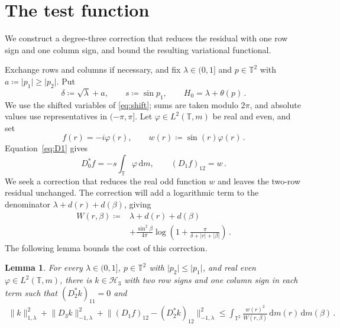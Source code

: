 \documentclass[11pt]{amsart}
\theoremstyle{plain}
\newtheorem{lemma}[theorem]{Lemma}
\theoremstyle{definition}
\newcommand{\T}{\mathbb T}
\newcommand{\1}{\mathbf 1}
\newcommand{\norm}[1]{\lVert #1\rVert}
\newcommand{\abs}[1]{\lvert #1\rvert}
\newcommand{\dd}{\,\mathrm d}
\newcommand{\Hs}{\mathcal H}
\newcommand{\Hminus}[1]{\norm{#1}_{-1,\lambda}}
\newcommand{\Hplus}[1]{\norm{#1}_{1,\lambda}}
\begin{document}
\section{The test function}\label{sec:evaluation}

We construct a degree-three correction that reduces the residual with
one row sign and one column sign, and bound the resulting variational
functional.

Exchange rows and columns if necessary, and fix
$\lambda\in(0,1]$ and $p\in\T^2$ with
$a\coloneqq\abs{p_1}\geq\abs{p_2}$.
Put
\begin{equation}\label{eq:degree-one-parameters}
  \delta\coloneqq\sqrt\lambda+a,\qquad
  s\coloneqq\sin p_1,\qquad H_0=\lambda+\theta(p)\, .
\end{equation}
We use the shifted variables of \eqref{eq:shift}; sums are taken modulo
$2\pi$, and absolute values use representatives in $(-\pi,\pi]$.
Let $\varphi\in L^2(\T,m)$ be real and even, and set
\begin{equation}\label{eq:f}
  f(r)=-i\varphi(r),\qquad w(r)\coloneqq\sin(r)\varphi(r)\, .
\end{equation}
Equation~\eqref{eq:D1} gives
\begin{equation}\label{eq:degree-one-images}
  D_0^*f=-s\int_\T\varphi\dd m,\qquad (D_1f)_{12}=w\, .
\end{equation}
We seek a correction that reduces the real odd function $w$ and leaves
the two-row residual unchanged.  The correction will add a logarithmic
term to the denominator $\lambda+d(r)+d(\beta)$, giving
\begin{equation}\label{eq:mixed-weight}
\begin{split}
  W(r,\beta)\coloneqq{}&\lambda+d(r)+d(\beta)\\
  &+\frac{\sin^2\beta}{4\pi}
    \log\left(1+\frac\pi{\delta+\abs r+\abs\beta}\right)\, .
\end{split}
\end{equation}
The following lemma bounds the cost of this correction.

\begin{lemma}\label{lem:parity}
For every $\lambda\in(0,1]$, $p\in\T^2$ with
$\abs{p_2}\leq\abs{p_1}$, and real even
$\varphi\in L^2(\T,m)$, there is $k\in\Hs_3$ with two row signs and one
column sign in each term such that
$(D_2^*k)_{11}=0$ and
\begin{equation}\label{eq:correction-cost}
\begin{split}
  \Hplus k^2+\Hminus{D_3k}^2
  +\Hminus{(D_1f)_{12}-(D_2^*k)_{12}}^2
  \leq\int_{\T^2}\frac{w(r)^2}{W(r,\beta)}
  \dd m(r)\dd m(\beta)\, .
\end{split}
\end{equation}
\end{lemma}
\end{document}
